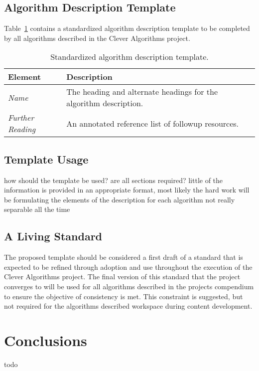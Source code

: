 \documentclass[a4paper, 11pt]{article}
\begin{document}
\subsection{Algorithm Description Template}
Table~\ref{tab:template} contains a standardized algorithm description template to be completed by all algorithms described in the Clever Algorithms project.

\begin{table}[ht]
	\centering
		\begin{tabularx}{\textwidth}{lX}
		\toprule
		\textbf{Element} & \textbf{Description} \\ 
		\toprule
		\emph{Name} & The heading and alternate headings for the algorithm description.  \\ 
		\midrule
		\emph{Further Reading} & An annotated reference list of followup resources. \\
		\bottomrule
		\end{tabularx}	
	\caption{Standardized algorithm description template.}
	\label{tab:template}
\end{table}

\subsection{Template Usage}
how should the template be used? are all sections required? little of the information is provided in an appropriate format, most likely the hard work will be formulating the elements of the description for each algorithm
not really separable all the time

\subsection{A Living Standard}
The proposed template should be considered a first draft of a standard that is expected to be refined through adoption and use throughout the execution of the Clever Algorithms project. The final version of this standard that the project converges to will be used for all algorithms described in the projects compendium to ensure the objective of consistency is met. This constraint is suggested, but not required for the algorithms described workspace during content development.

\section{Conclusions}
\label{sec:conclusions}
todo



\end{document}
